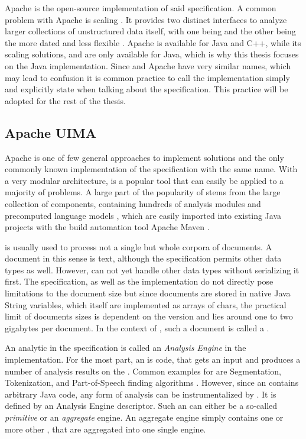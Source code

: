 Apache \uima{} is the open-source implementation of said \uima{} specification. A common problem with Apache \uima{} is scaling \cite{divita2015scaling,epstein2012making,ramakrishnan2010building}. It  provides two distinct interfaces to analyze larger collections of unstructured data itself, with one being \uimaas{} and the other being the more dated and less flexible \cpe{} \cite{OASIS:UIMA:2009}.
Apache \uima{} is available for Java and C++, while its scaling solutions, \uimacpe{} and \uimaas{} are only available for Java, which is why this thesis focuses on the Java implementation. Since \uima{} and Apache \uima{} have very similar names, which may lead to confusion it is common practice to call the implementation simply \uima{} and explicitly state when talking about the specification. This practice will be adopted for the rest of the thesis.



\subsection{Apache UIMA}

Apache \uima{} is one of few general approaches to implement \nlp{} solutions and the only commonly known implementation of the specification with the same name. With a very modular architecture, \uima{} is a popular tool that can easily be applied to a majority of \nlp{} problems. A large part of the popularity of \uima{} stems from the large \dkpro{} collection of components, containing hundreds of analysis modules and precomputed language models \cite{eckartdecastilho-gurevych:2014:OIAF4HLT}, which are easily imported into existing Java projects with the build automation tool Apache Maven \cite{dkpro}.

\uima{} is usually used to process not a single but whole corpora of documents. A document in this sense is text, although the \uima{} specification permits other data types as well. However, \uima{} can not yet handle other data types without serializing it first. The \uima{} specification, as well as the implementation do not directly pose limitations to the document size but since documents are stored in native Java String variables, which itself are implemented as arrays of chars, the practical limit of documents sizes is dependent on the \jvm{} version and lies around one to two gigabytes \cite{so:javastrings} per document. In the context of \uima{}, such a document is called a \sofa{}.

An analytic in the \uima{} specification is called an \emph{Analysis Engine} in the implementation. For the most part, an \anen{} is code, that gets an input \cas{} and produces a number of analysis results on the \sofa{}. Common examples for \anens{} are Segmentation, Tokenization, and Part-of-Speech finding algorithms \cite{dkpro}. However, since an \anen{} contains arbitrary Java code, any form of analysis can be instrumentalized by \uima{}. It is defined by an \xml{} Analysis Engine descriptor. Such an \anen{} can either be a so-called \emph{primitive} or an \emph{aggregate} engine. An aggregate engine simply contains one or more other \anens{}, that are aggregated into one single engine.

